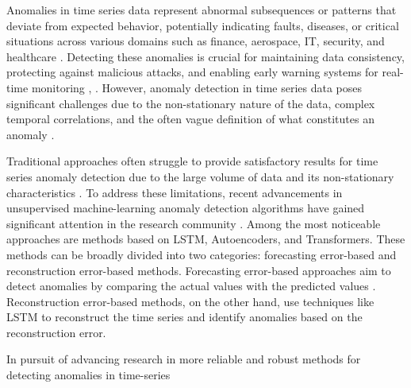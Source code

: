 \documentclass[conference]{IEEEtran}
\begin{document}
Anomalies in time series data represent abnormal subsequences or patterns that deviate from expected behavior, potentially indicating faults, diseases, or critical situations across various domains such as finance, aerospace, IT, security, and healthcare \cite{geiger_tadgan:_2020,ji_novel_2021}. Detecting these anomalies is crucial for maintaining data consistency, protecting against malicious attacks, and enabling early warning systems for real-time monitoring \cite{ji_novel_2021}, \cite{laptev_generic_2015}. However, anomaly detection in time series data poses significant challenges due to the non-stationary nature of the data, complex temporal correlations, and the often vague definition of what constitutes an anomaly \cite{geiger_tadgan:_2020,zhou_anomaly_2021}.

Traditional approaches often struggle to provide satisfactory results for time series anomaly detection due to the large volume of data and its non-stationary characteristics \cite{zhou_anomaly_2021}. To address these limitations, recent advancements in unsupervised machine-learning anomaly detection algorithms have gained significant attention in the research community \cite{audibert_deep_2022,geiger_tadgan:_2020}. 
Among the most noticeable approaches are methods based on LSTM, Autoencoders, and Transformers. These methods can be broadly divided into two categories: forecasting error-based and reconstruction error-based methods. Forecasting error-based approaches aim to detect anomalies by comparing the actual values with the predicted values \cite{yuan2024novelddpmbasedensembleapproach}. Reconstruction error-based methods, on the other hand, use techniques like LSTM to reconstruct the time series and identify anomalies based on the reconstruction error.

In pursuit of advancing research in more reliable and robust methods for detecting anomalies in time-series
\end{document}
